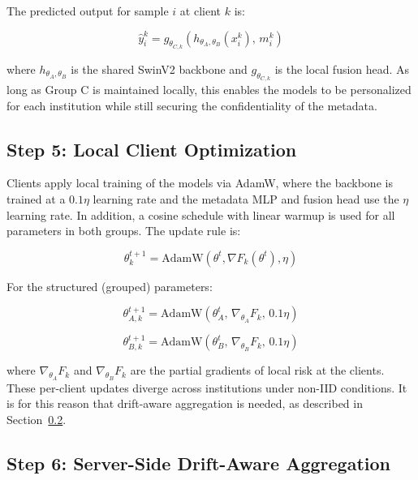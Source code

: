 \documentclass[utf8]{FrontiersinHarvard} %
\begin{document}
The predicted output for sample $i$ at client $k$ is:

\begin{equation}
\label{eq:prediction}
\hat{y}_i^k = g_{\theta_{C,k}}\!\left(h_{\theta_A,\theta_B}(x_i^k),\, m_i^k\right)
\end{equation}

where $h_{\theta_A,\theta_B}$ is the shared SwinV2 backbone and $g_{\theta_{C,k}}$ is the local fusion head. As long as Group C is maintained locally, this enables the models to be personalized for each institution while still securing the confidentiality of the metadata.

\subsection{Step 5: Local Client Optimization}

Clients apply local training of the models via AdamW, where the backbone is trained at a $0.1\eta$ learning rate and the metadata MLP and fusion head use the $\eta$ learning rate. In addition, a cosine schedule with linear warmup is used for all parameters in both groups. The update rule is:

\begin{equation}
\label{eq:local_update}
\theta_k^{t+1} = \text{AdamW}(\theta^t, \nabla F_k(\theta^t), \eta)
\end{equation}

For the structured (grouped) parameters:

\begin{equation}
\label{eq:groupA_update}
\theta_{A,k}^{t+1} = \text{AdamW}\!\left(\theta_A^t,\, \nabla_{\theta_A} F_k,\, 0.1\eta\right)
\end{equation}

\begin{equation}
\label{eq:groupB_update}
\theta_{B,k}^{t+1} = \text{AdamW}\!\left(\theta_B^t,\, \nabla_{\theta_B} F_k,\, 0.1\eta\right)
\end{equation}

where $\nabla_{\theta_A} F_k$ and $\nabla_{\theta_B} F_k$ are the partial gradients of local risk at the clients. These per-client updates diverge across institutions under non-IID conditions. It is for this reason that drift-aware aggregation is needed, as described in Section~\ref{sec:drift_agg}.

\subsection{Step 6: Server-Side Drift-Aware Aggregation}
\label{sec:drift_agg}
\end{document}
